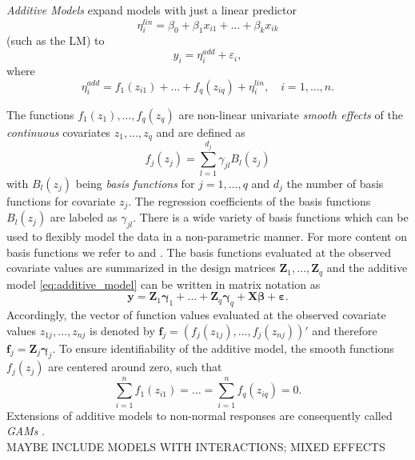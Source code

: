 
\textit{Additive Models} expand models with just a linear predictor  
$$
\eta_{i}^{lin} = \beta_{0}+\beta_{1} x_{i1}+\ldots+\beta_{k} x_{i k}
$$
(such as the \ac{LM}) to 
\begin{equation}
y_{i} = \eta_{i}^{add} + \varepsilon_{i} ,
\label{eq:additive_model}
\end{equation}
where 
\begin{equation}
\eta_{i}^{a d d}=f_{1}\left(z_{i 1}\right)+\ldots+f_{q}\left(z_{i q}\right)+\eta_{i}^{l i n}, \quad i = 1, \ldots, n.
\end{equation}

The functions $f_{1}(z_{1}), \ldots, f_{q}(z_{q})$ are non-linear univariate \textit{smooth effects} of the \textit{continuous} covariates $z_1, \ldots, z_q$ and are defined as
\begin{equation}
f_{j}\left(z_{j}\right)=\sum_{l=1}^{d_{j}} \gamma_{j l} B_{l}\left(z_{j}\right)
\end{equation}
with $B_{l}\left(z_{j}\right)$ being \textit{basis functions} for $j = 1, \ldots, q$ and $d_j$ the number of basis functions for covariate $z_j$. The regression coefficients of the basis functions $B_l(z_j)$ are labeled as $\gamma_{jl}$. There is a wide variety of basis functions which can be used to flexibly model the data in a non-parametric manner. For more content on basis functions we refer to \cite{wood2017generalized} and \cite{fahrmeir2003regression}. The basis functions evaluated at the observed covariate values are summarized in the design matrices $\bm{Z}_1, \ldots, \bm{Z}_q$ and the additive model \ref{eq:additive_model} can be written in matrix notation as
$$
\bm{y} = \bm{Z}_1 \bm{\gamma}_1 + \ldots + \bm{Z}_q \bm{\gamma}_q + \bm{X} \bm{\beta} + \bm{\varepsilon}.
$$
Accordingly, the vector of function values evaluated at the observed covariate values $z_{1j}, \ldots, z_{nj}$ is denoted by $\bm{f}_j = (f_j(z_{1j}), \ldots, f_j(z_{nj}))' $ and therefore $\bm{f}_j = \bm{Z}_j \bm{\gamma}_j$. To ensure identifiability of the additive model, the smooth functions $f_j(z_j)$ are centered around zero, such that
$$
\sum_{i=1}^{n} f_{1}\left(z_{i 1}\right)=\ldots=\sum_{i=1}^{n} f_{q}\left(z_{i q}\right)=0.
$$
Extensions of additive models to non-normal responses are consequently called \textit{\acp{GAM}} \citep{hastie1990generalized}.  \\


MAYBE INCLUDE MODELS WITH INTERACTIONS; MIXED EFFECTS



